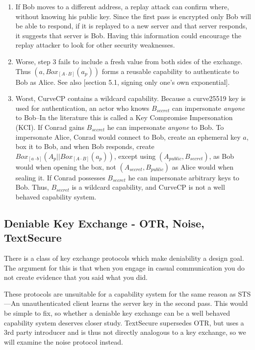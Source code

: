 \documentclass[12pt]{article}
\begin{document}
\begin{enumerate}
  \item If Bob moves to a different address, a replay attack can
    confirm where, without knowing his public key.
    Since the first pass is encrypted only Bob will be able to respond,
    if it is replayed to a new server and that server responds,
    it  suggests that server is Bob.
    Having this information could encourage the replay attacker
    to look for other security weaknesses.

  \item Worse,
    step 3 fails to include a fresh value from both sides of the
    exchange. Thus $(a, Box_{[A \cdot B]}(a_{p}))$ forms a reusable capability
    to authenticate to Bob as Alice\cite{ccp_review}. See also
    \cite{aake}[section 5.1, signing only one's own exponential].

  \item Worst, CurveCP contains a wildcard capability.
    Because a curve25519 key is used for authentication,
    an actor who knows $B_{secret}$ \cite{ccp_review} can
    impersonate \emph{anyone} to Bob--In the literature
    this is called a Key Compromise Impersonation (KCI).
    If Conrad gains
    $B_{secret}$ he can impersonate \emph{anyone} to Bob.
    To impersonate Alice, Conrad would connect to Bob,
    create an ephemeral key $a$, box it to Bob, and when Bob responds,
    create $Box_{[a\cdot b]}(A_p||Box_{[A \cdot B]}(a_{p}))$,
    except using $(A_{public}, B_{secret})$,
    as Bob would when opening the box, not $(A_{secret}, B_{public})$ as
    Alice would when sealing it. If Conrad possesses $B_{secret}$ he can
    impersonate arbitrary keys to Bob. Thus, $B_{secret}$ is a wildcard
    capability, and CurveCP is not a well behaved capability system.

\end{enumerate}

\subsection{Deniable Key Exchange - OTR, Noise, TextSecure}

There is a class of key exchange protocols which make deniability
a design goal\cite{otr, textsecure, noise}. The argument for this
is that when you engage in casual communication you do not create
evidence that you said what you did.

These protocols are unsuitable for a capability system for the same
reason as STS---An unauthenticated client learns the server key in
the second pass. This would be simple to fix, so whether a deniable
key exchange can be a well behaved capability system deserves closer study.
TextSecure\cite{textsecure} supersedes OTR\cite{otr}, but
uses a 3rd party introducer and is thus not directly analogous to
a key exchange, so we will examine the noise\cite{noise} protocol
instead.
\end{document}
